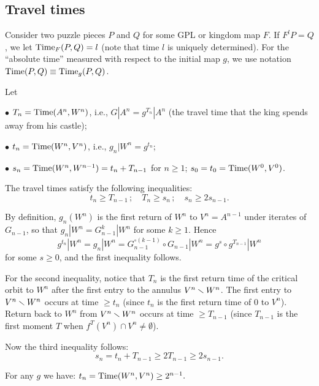 \subsection{Travel times} 
  Consider two puzzle pieces $P$ and $Q$ for some GPL or kingdom map $F$.
If $F^l P = Q$, we let $\operatorname{Time}_F (P,Q) =l$
(note that time $l$ is uniquely determined). 
For the ``absolute time'' measured with respect to the initial map $g$, we use notation
 $\operatorname{Time}(P,Q) \equiv \operatorname{Time}_g (P,Q)$. 

   
Let

\ssk \nin $\bullet$ $T_n= \operatorname{Time} (A^n, W^n)$, 
i.e., $ G |A^n = g^{T_n}|A^n$
(the travel time that the king  spends  away from his castle);

\ssk\nin $\bullet$ $t_n= \operatorname{Time}(W^n, V^n)$, i.e., $g_n| W^n = g^{t_n}$;  

\ssk\nin $\bullet$ $s_n = \operatorname{Time} (W^n, W^{n-1})  = t_n+ T_{n-1}$ for $n\geq 1$;  $s_0=t_0=\operatorname{Time} (W^0, V^0)$. 


\begin{lem}\label{t-T-s}
The travel times satisfy the following inequalities:
    $$     t_n\geq T_{n-1}\,; \quad     T_n \geq s_n \, ; \quad    s_n \geq 2 s_{n-1} . $$

\end{lem} 

\begin{pf}
By definition, $g_n(W^n)$ is the first return of $W^n$ to $V^n=A^{n-1}$ under iterates of $G_{n-1}$,
so that $g_n|W^n = G_{n-1}^k|W^n$ for some $k\geq 1$.
Hence 
$$
   g^{t_n}|W^n = g_n|W^n = G_{n-1}^{\circ(k-1)}\circ G_{n-1}|W^n = g^s\circ g^{T_{n-1}}|W^n
$$ 
for some $s\geq 0$,
and the first inequality follows. 

For the second inequality, notice that $T_n$ is the first return time of the critical orbit
to $W^n$ after the first entry to the annulus $V^n\smallsetminus W^n$. 
The first entry to $V^n\smallsetminus W^n$ occurs at time $\geq t_n$ (since $t_n$ is the first return time of 0 to $V^n$).
Return back to $W^n$ from $V^n\smallsetminus W^n$ occurs  at time $\geq T_{n-1}$ (since $T_{n-1}$ is the first moment  $T$
when $f^T(V^n)\cap V^n\not=\emptyset$).

Now the  third inequality follows:
$$
  s_n= t_n+T_{n-1} \geq 2 T_{n-1} \geq  2 s_{n-1}. 
$$

\end{pf} 

\begin{cor}\label{growth}
For any $g$  %
we have:   $t_n=\operatorname{Time}(W^n,V^n) \geq 2^{n-1}.$
\end{cor}     



